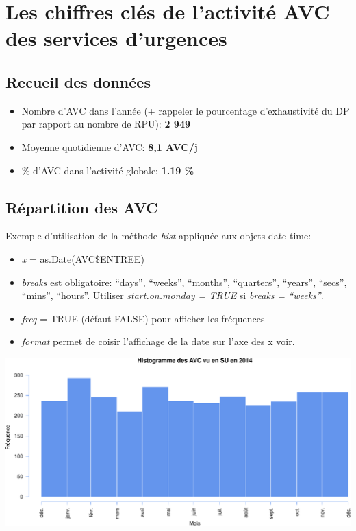 \documentclass[]{article}
\begin{document}
\section{Les chiffres clés de l'activité AVC des services
d'urgences}\label{les-chiffres-cles-de-lactivite-avc-des-services-durgences}

\subsection{Recueil des données}\label{recueil-des-donnees-3}

\begin{itemize}
\itemsep1pt\parskip0pt
\item
  Nombre d'AVC dans l'année (+ rappeler le pourcentage d'exhaustivité du
  DP par rapport au nombre de RPU): \textbf{2 949}
\item
  Moyenne quotidienne d'AVC: \textbf{8,1 AVC/j}
\item
  \% d'AVC dans l'activité globale: \textbf{1.19 \%}
\end{itemize}

\subsection{Répartition des AVC}\label{repartition-des-avc}

Exemple d'utilisation de la méthode \emph{hist} appliquée aux objets
date-time:

\begin{itemize}
\itemsep1pt\parskip0pt
\item
  \emph{x} = as.Date(AVC\$ENTREE)
\item
  \emph{breaks} est obligatoire: ``days'', ``weeks'', ``months'',
  ``quarters'', ``years'', ``secs'', ``mins'', ``hours''. Utiliser
  \emph{start.on.monday = TRUE} si \emph{breaks = ``weeks''}.
\item
  \emph{freq} = TRUE (défaut FALSE) pour afficher les fréquences
\item
  \emph{format} permet de coisir l'affichage de la date sur l'axe des x
  \href{https://stat.ethz.ch/R-manual/R-devel/library/base/html/strptime.html}{voir}.
\end{itemize}

\includegraphics{Figs/hist_avc-1.pdf}
\end{document}
